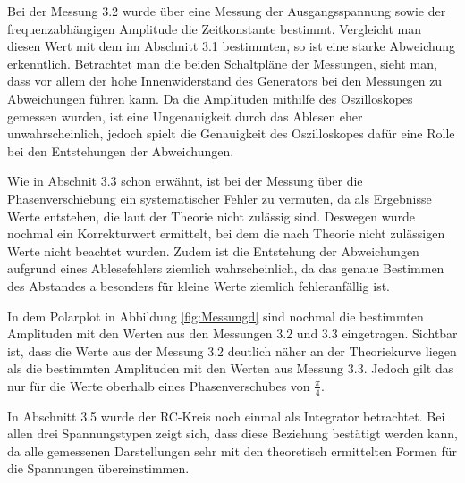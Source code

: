 Bei der Messung 3.2 wurde über eine Messung der Ausgangsspannung sowie der
frequenzabhängigen Amplitude die Zeitkonstante bestimmt. Vergleicht man diesen
Wert mit dem im Abschnitt 3.1 bestimmten, so ist eine starke Abweichung erkenntlich.
Betrachtet man die beiden Schaltpläne der Messungen, sieht man, dass vor allem
der hohe Innenwiderstand des Generators bei den Messungen zu Abweichungen führen
kann. Da die Amplituden mithilfe des Oszilloskopes gemessen wurden, ist eine
Ungenauigkeit durch das Ablesen eher unwahrscheinlich, jedoch spielt die Genauigkeit
des Oszilloskopes dafür eine Rolle bei den Entstehungen der Abweichungen.


Wie in Abschnit 3.3 schon erwähnt, ist bei der Messung über
die Phasenverschiebung ein systematischer Fehler zu vermuten, da als Ergebnisse
Werte entstehen, die laut der Theorie nicht zulässig sind. Deswegen wurde
nochmal ein Korrekturwert ermittelt, bei dem die nach Theorie nicht zulässigen
Werte nicht beachtet wurden. Zudem ist die Entstehung der Abweichungen aufgrund
eines Ablesefehlers ziemlich wahrscheinlich, da das genaue Bestimmen des
Abstandes a besonders für kleine Werte ziemlich fehleranfällig ist.

In dem Polarplot in Abbildung \ref{fig:Messungd} sind nochmal die bestimmten Amplituden
mit den Werten aus den Messungen 3.2 und 3.3 eingetragen. Sichtbar ist, dass die
Werte aus der Messung 3.2 deutlich näher an der Theoriekurve liegen als die bestimmten
Amplituden mit den Werten aus Messung 3.3. Jedoch gilt das nur für die Werte
oberhalb eines Phasenverschubes von $\frac{\pi}{4}$.

In Abschnitt 3.5 wurde der RC-Kreis noch einmal als Integrator betrachtet. Bei allen
drei Spannungstypen zeigt sich, dass diese Beziehung bestätigt werden kann, da alle
gemessenen Darstellungen sehr mit den theoretisch ermittelten Formen für die
Spannungen übereinstimmen.
